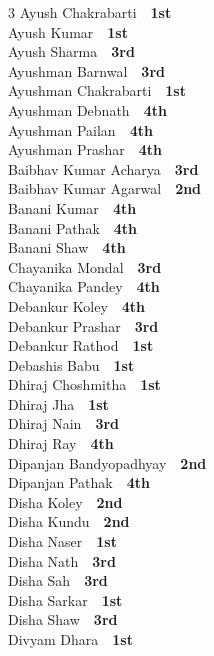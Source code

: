 \documentclass[11pt,a4paper]{article}
\begin{document}
\begin{multicols}{3}
Ayush Chakrabarti~\dotfill~\textbf{1st}\\
Ayush Kumar~\dotfill~\textbf{1st}\\
Ayush Sharma~\dotfill~\textbf{3rd}\\
Ayushman Barnwal~\dotfill~\textbf{3rd}\\
Ayushman Chakrabarti~\dotfill~\textbf{1st}\\
Ayushman Debnath~\dotfill~\textbf{4th}\\
Ayushman Pailan~\dotfill~\textbf{4th}\\
Ayushman Prashar~\dotfill~\textbf{4th}\\
Baibhav Kumar Acharya~\dotfill~\textbf{3rd}\\
Baibhav Kumar Agarwal~\dotfill~\textbf{2nd}\\
Banani Kumar~\dotfill~\textbf{4th}\\
Banani Pathak~\dotfill~\textbf{4th}\\
Banani Shaw~\dotfill~\textbf{4th}\\
Chayanika Mondal~\dotfill~\textbf{3rd}\\
Chayanika Pandey~\dotfill~\textbf{4th}\\
Debankur Koley~\dotfill~\textbf{4th}\\
Debankur Prashar~\dotfill~\textbf{3rd}\\
Debankur Rathod~\dotfill~\textbf{1st}\\
Debashis Babu~\dotfill~\textbf{1st}\\
Dhiraj Choshmitha~\dotfill~\textbf{1st}\\
Dhiraj Jha~\dotfill~\textbf{1st}\\
Dhiraj Nain~\dotfill~\textbf{3rd}\\
Dhiraj Ray~\dotfill~\textbf{4th}\\
Dipanjan Bandyopadhyay~\dotfill~\textbf{2nd}\\
Dipanjan Pathak~\dotfill~\textbf{4th}\\
Disha Koley~\dotfill~\textbf{2nd}\\
Disha Kundu~\dotfill~\textbf{2nd}\\
Disha Naser~\dotfill~\textbf{1st}\\
Disha Nath~\dotfill~\textbf{3rd}\\
Disha Sah~\dotfill~\textbf{3rd}\\
Disha Sarkar~\dotfill~\textbf{1st}\\
Disha Shaw~\dotfill~\textbf{3rd}\\
Divyam Dhara~\dotfill~\textbf{1st}\\

\end{multicols}
\end{document}
